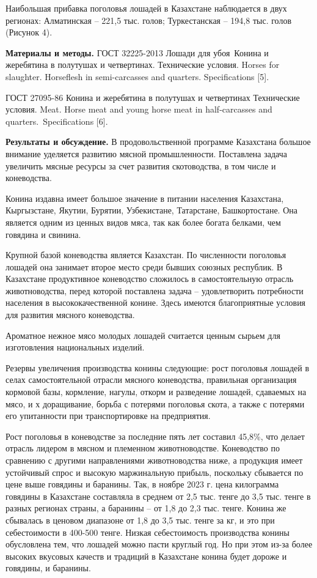 \begin{multicols}{2}

Наибольшая прибавка поголовья лошадей в Казахстане наблюдается в двух
регионах: Алматинская -- 221,5 тыс. голов; Туркестанская -- 194,8 тыс.
голов (Рисунок 4).

{\bfseries Материалы и методы.} ГОСТ 32225-2013 Лошади для убоя~Конина и
жеребятина в полутушах и четвертинах. Технические условия. Horses for
slaughter. Horseflesh in semi-carcasses and quarters. Specifications
{[}5{]}.

ГОСТ 27095-86 Конина и жеребятина в полутушах и четвертинах Технические
условия. Meat. Horse meat and young horse meat in half-carcasses and
quarters.~Specifications {[}6{]}.

{\bfseries Результаты и обсуждение.} В продовольственной программе Казахстана
большое внимание уделяется развитию мясной промышленности. Поставлена
задача увеличить мясные ресурсы за счет развития скотоводства, в том
числе и коневодства.

Конина издавна имеет большое значение в питании населения Казахстана,
Кыргызстане, Якутии, Бурятии, Узбекистане, Татарстане, Башкортостане.
Она является одним из ценных видов мяса, так как более богата белками,
чем говядина и свинина.

Крупной базой коневодства является Казахстан. По численности поголовья
лошадей она занимает второе место среди бывших союзных республик. В
Казахстане продуктивное коневодство сложилось в самостоятельную отрасль
животноводства, перед которой поставлена задача -- удовлетворить
потребности населения в высококачественной конине. Здесь имеются
благоприятные условия для развития мясного коневодства.

Ароматное нежное мясо молодых лошадей считается ценным сырьем для
изготовления национальных изделий.

Резервы увеличения производства конины следующие: рост поголовья лошадей
в селах самостоятельной отрасли мясного коневодства, правильная
организация кормовой базы, кормление, нагулы, откорм и разведение
лошадей, сдаваемых на мясо, и х доращивание, борьба с потерями поголовья
скота, а также с потерями его упитанности при транспортировке на
предприятия.

Рост поголовья в коневодстве за последние пять лет составил 45,8\%, что
делает отрасль лидером в мясном и племенном животноводстве. Коневодство
по сравнению с другими направлениями животноводства ниже, а продукция
имеет устойчивый спрос и высокую маржинальную прибыль, поскольку
сбывается по цене выше говядины и баранины. Так, в ноябре 2023 г. цена
килограмма говядины в Казахстане составляла в среднем от 2,5 тыс. тенге
до 3,5 тыс. тенге в разных регионах страны, а баранины -- от 1,8 до 2,3
тыс. тенге. Конина же сбывалась в ценовом диапазоне от 1,8 до 3,5 тыс.
тенге за кг, и это при себестоимости в 400-500 тенге. Низкая
себестоимость производства конины обусловлена тем, что лошадей можно
пасти круглый год. Но при этом из-за более высоких вкусовых качеств и
традиций в Казахстане конина будет дороже и говядины, и баранины.


\end{multicols}
